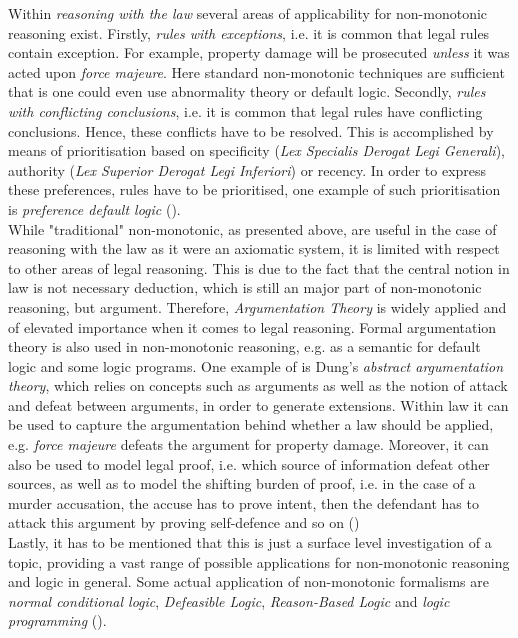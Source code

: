 \documentclass{extarticle}
\begin{document}
Within \emph{reasoning with the law} several areas of applicability for non-monotonic reasoning exist. Firstly, \emph{rules with exceptions}, i.e. it is common that legal rules contain exception. For example, property damage will be prosecuted \emph{unless} it was acted upon \emph{force majeure}. Here  standard non-monotonic techniques are sufficient that is one could even use abnormality theory or default logic.
Secondly, \emph{rules with conflicting conclusions}, i.e. it is common that legal rules have conflicting conclusions. Hence, these conflicts have to be resolved. This is accomplished by means of prioritisation based on specificity (\emph{Lex Specialis Derogat Legi Generali}), authority (\emph{Lex Superior Derogat Legi Inferiori}) or recency. In order to express these preferences, rules have to be prioritised, one example of such prioritisation is \emph{preference default logic} (\cite{prakken2015law,Prakken2017, ANTONIOU2007517}).\\

While "traditional" non-monotonic, as presented above, are useful in the case of reasoning with the law as it were an axiomatic system, it is limited with respect to other areas of legal reasoning. This is due to the fact that the central notion in law is not necessary deduction, which is still an major part of non-monotonic reasoning, but argument. Therefore, \emph{Argumentation Theory} is widely applied and of elevated importance when it comes to legal reasoning. Formal argumentation theory is also used in non-monotonic reasoning, e.g. as a semantic for default logic and some logic programs. One example of is Dung's \emph{abstract argumentation theory}, which relies on concepts such as arguments as well as the notion of attack and defeat between arguments, in order to generate extensions. Within law it can be used to capture the argumentation behind whether a law should be applied, e.g. \emph{force majeure} defeats the argument for property damage. Moreover, it can also be used to model legal proof, i.e. which source of information defeat other sources, as well as to model the shifting burden of proof, i.e. in the case of a murder accusation, the accuse has to prove intent, then the defendant has to attack this argument by proving self-defence and so on (\cite{prakken2015law}) \\

Lastly, it has to be mentioned that this is just a surface level investigation of a topic, providing a vast range of possible applications for non-monotonic reasoning and logic in general. Some actual application of non-monotonic formalisms are \emph{normal conditional logic}, \emph{Defeasible Logic}, \emph{Reason-Based Logic} and \emph{logic programming}    (\cite{prakken2015law}).\\
\end{document}
